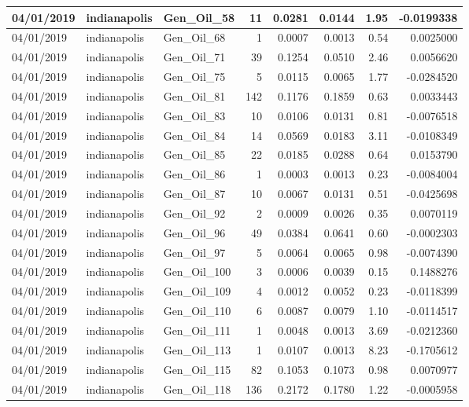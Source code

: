 \documentclass[
  letterpaper,
  DIV=11,
  numbers=noendperiod]{scrartcl}
\begin{document}
\begin{tabular}{l|l|l|r|r|r|r|r}
\hline
04/01/2019 & indianapolis & Gen\_Oil\_58 & 11 & 0.0281 & 0.0144 & 1.95 & -0.0199338\\
\hline
04/01/2019 & indianapolis & Gen\_Oil\_68 & 1 & 0.0007 & 0.0013 & 0.54 & 0.0025000\\
\hline
04/01/2019 & indianapolis & Gen\_Oil\_71 & 39 & 0.1254 & 0.0510 & 2.46 & 0.0056620\\
\hline
04/01/2019 & indianapolis & Gen\_Oil\_75 & 5 & 0.0115 & 0.0065 & 1.77 & -0.0284520\\
\hline
04/01/2019 & indianapolis & Gen\_Oil\_81 & 142 & 0.1176 & 0.1859 & 0.63 & 0.0033443\\
\hline
04/01/2019 & indianapolis & Gen\_Oil\_83 & 10 & 0.0106 & 0.0131 & 0.81 & -0.0076518\\
\hline
04/01/2019 & indianapolis & Gen\_Oil\_84 & 14 & 0.0569 & 0.0183 & 3.11 & -0.0108349\\
\hline
04/01/2019 & indianapolis & Gen\_Oil\_85 & 22 & 0.0185 & 0.0288 & 0.64 & 0.0153790\\
\hline
04/01/2019 & indianapolis & Gen\_Oil\_86 & 1 & 0.0003 & 0.0013 & 0.23 & -0.0084004\\
\hline
04/01/2019 & indianapolis & Gen\_Oil\_87 & 10 & 0.0067 & 0.0131 & 0.51 & -0.0425698\\
\hline
04/01/2019 & indianapolis & Gen\_Oil\_92 & 2 & 0.0009 & 0.0026 & 0.35 & 0.0070119\\
\hline
04/01/2019 & indianapolis & Gen\_Oil\_96 & 49 & 0.0384 & 0.0641 & 0.60 & -0.0002303\\
\hline
04/01/2019 & indianapolis & Gen\_Oil\_97 & 5 & 0.0064 & 0.0065 & 0.98 & -0.0074390\\
\hline
04/01/2019 & indianapolis & Gen\_Oil\_100 & 3 & 0.0006 & 0.0039 & 0.15 & 0.1488276\\
\hline
04/01/2019 & indianapolis & Gen\_Oil\_109 & 4 & 0.0012 & 0.0052 & 0.23 & -0.0118399\\
\hline
04/01/2019 & indianapolis & Gen\_Oil\_110 & 6 & 0.0087 & 0.0079 & 1.10 & -0.0114517\\
\hline
04/01/2019 & indianapolis & Gen\_Oil\_111 & 1 & 0.0048 & 0.0013 & 3.69 & -0.0212360\\
\hline
04/01/2019 & indianapolis & Gen\_Oil\_113 & 1 & 0.0107 & 0.0013 & 8.23 & -0.1705612\\
\hline
04/01/2019 & indianapolis & Gen\_Oil\_115 & 82 & 0.1053 & 0.1073 & 0.98 & 0.0070977\\
\hline
04/01/2019 & indianapolis & Gen\_Oil\_118 & 136 & 0.2172 & 0.1780 & 1.22 & -0.0005958\\

\end{tabular}
\end{document}
